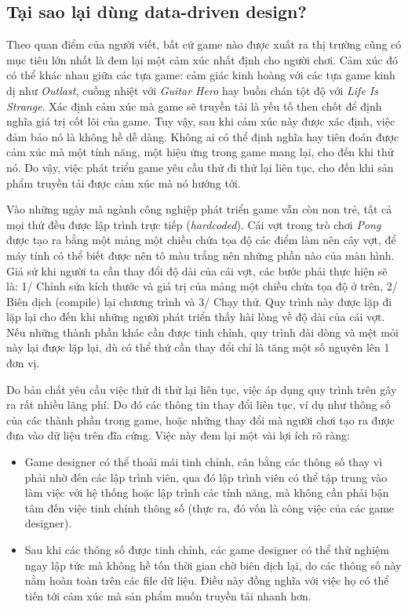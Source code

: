 \documentclass[12pt]{report}
\begin{document}
\subsection{Tại sao lại dùng data-driven design?}
Theo quan điểm của người viết, bất cứ game nào được xuất ra thị trường cũng có mục tiêu lớn nhất là đem lại một cảm xúc nhất định cho người chơi. Cảm xúc đó có thể khác nhau giữa các tựa game: cảm giác kinh hoàng với các tựa game kinh dị như \textit{Outlast}, cuồng nhiệt với \textit{Guitar Hero} hay buồn chán tột độ với \textit{Life Is Strange}. Xác định cảm xúc mà game sẽ truyền tải là yếu tố then chốt để định nghĩa giá trị cốt lõi của game. Tuy vậy, sau khi cảm xúc này được xác định, việc đảm bảo nó là không hề dễ dàng. Không ai có thể định nghĩa hay tiên đoán được cảm xúc mà một tính năng, một hiệu ứng trong game mang lại, cho đến khi thử nó. Do vậy, việc phát triển game yêu cầu thử đi thử lại liên tục, cho đến khi sản phẩm truyền tải được cảm xúc mà nó hướng tới.

Vào những ngày mà ngành công nghiệp phát triển game vẫn còn non trẻ, tất cả mọi thứ đều được lập trình trực tiếp (\textit{hardcoded}). Cái vợt trong trò chơi \textit{Pong} được tạo ra bằng một mảng một chiều chứa tọa độ các điểm làm nên cây vợt, để máy tính có thể biết được nên tô màu trắng nên những phần nào của màn hình. Giả sử khi người ta cần thay đổi độ dài của cái vợt, các bước phải thực hiện sẽ là: 1/ Chỉnh sửa kích thước và giá trị của mảng một chiều chứa tọa độ ở trên, 2/ Biên dịch (compile) lại chương trình và 3/ Chạy thử. Quy trình này được lặp đi lặp lại cho đến khi những người phát triển thấy hài lòng về độ dài của cái vợt. Nếu những thành phần khác cần được tinh chỉnh, quy trình dài dòng và mệt mỏi này lại được lặp lại, dù có thể thứ cần thay đổi chỉ là tăng một số nguyên lên 1 đơn vị.

Do bản chất yêu cầu việc thử đi thử lại liên tục, việc áp dụng quy trình trên gây ra rất nhiều lãng phí. Do đó các thông tin thay đổi liên tục, ví dụ như thông số của các thành phần trong game, hoặc những thay đổi mà người chơi tạo ra được đưa vào dữ liệu trên đĩa cứng. Việc này đem lại một vài lợi ích rõ ràng:
\begin{itemize}
	\item Game designer có thể thoải mái tinh chỉnh, cân bằng các thông số thay vì phải nhờ đến các lập trình viên, qua đó lập trình viên có thể tập trung vào làm việc với hệ thống hoặc lập trình các tính năng, mà không cần phải bận tâm đến việc tinh chỉnh thông số (thực ra, đó vốn là công việc của các game designer).
	\item Sau khi các thông số được tinh chỉnh, các game designer có thể thử nghiệm ngay lập tức mà không hề tốn thời gian chờ biên dịch lại, do các thông số này nằm hoàn toàn trên các file dữ liệu. Điều này đồng nghĩa với việc họ có thể tiến tới cảm xúc mà sản phẩm muốn truyền tải nhanh hơn.
\end{itemize}
\end{document}
